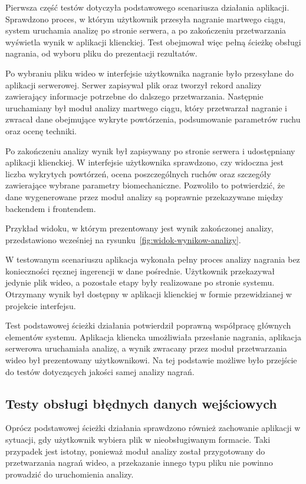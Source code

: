 Pierwsza część testów dotyczyła podstawowego scenariusza działania aplikacji. Sprawdzono proces, w którym użytkownik przesyła nagranie martwego ciągu, system uruchamia analizę po stronie serwera, a po zakończeniu przetwarzania wyświetla wynik w aplikacji klienckiej. Test obejmował więc pełną ścieżkę obsługi nagrania, od wyboru pliku do prezentacji rezultatów.

Po wybraniu pliku wideo w interfejsie użytkownika nagranie było przesyłane do aplikacji serwerowej. Serwer zapisywał plik oraz tworzył rekord analizy zawierający informacje potrzebne do dalszego przetwarzania. Następnie uruchamiany był moduł analizy martwego ciągu, który przetwarzał nagranie i zwracał dane obejmujące wykryte powtórzenia, podsumowanie parametrów ruchu oraz ocenę techniki.

Po zakończeniu analizy wynik był zapisywany po stronie serwera i udostępniany aplikacji klienckiej. W interfejsie użytkownika sprawdzono, czy widoczna jest liczba wykrytych powtórzeń, ocena poszczególnych ruchów oraz szczegóły zawierające wybrane parametry biomechaniczne. Pozwoliło to potwierdzić, że dane wygenerowane przez moduł analizy są poprawnie przekazywane między backendem i frontendem.

Przykład widoku, w którym prezentowany jest wynik zakończonej analizy, przedstawiono wcześniej na rysunku~\ref{fig:widok-wynikow-analizy}.

W testowanym scenariuszu aplikacja wykonała pełny proces analizy nagrania bez konieczności ręcznej ingerencji w dane pośrednie. Użytkownik przekazywał jedynie plik wideo, a pozostałe etapy były realizowane po stronie systemu. Otrzymany wynik był dostępny w aplikacji klienckiej w formie przewidzianej w projekcie interfejsu.

Test podstawowej ścieżki działania potwierdził poprawną współpracę głównych elementów systemu. Aplikacja kliencka umożliwiała przesłanie nagrania, aplikacja serwerowa uruchamiała analizę, a wynik zwracany przez moduł przetwarzania wideo był prezentowany użytkownikowi. Na tej podstawie możliwe było przejście do testów dotyczących jakości samej analizy nagrań.

\subsection{Testy obsługi błędnych danych wejściowych}

Oprócz podstawowej ścieżki działania sprawdzono również zachowanie aplikacji w sytuacji, gdy użytkownik wybiera plik w nieobsługiwanym formacie. Taki przypadek jest istotny, ponieważ moduł analizy został przygotowany do przetwarzania nagrań wideo, a przekazanie innego typu pliku nie powinno prowadzić do uruchomienia analizy.

